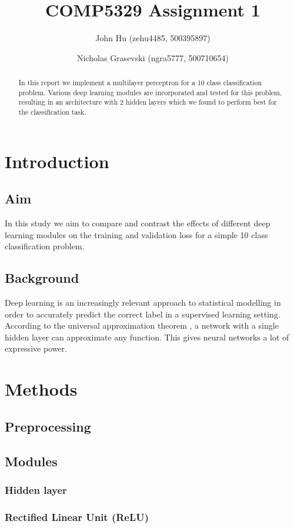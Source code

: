 \documentclass[landscape,twocolumn]{article}
\title{COMP5329 Assignment 1}
\author{John Hu (zehu4485, 500395897) \and Nicholas Grasevski (ngra5777, 500710654)}
\begin{document}
\maketitle
\begin{abstract}
In this report we implement a multilayer perceptron for a 10 class classification problem. Various deep learning modules are incorporated and tested for this problem, resulting in an architecture with 2 hidden layers which we found to perform best for the classification task.
\end{abstract}

\section{Introduction}
\subsection{Aim}
In this study we aim to compare and contrast the effects of different deep learning modules on the training and validation loss for a simple 10 class classification problem.

\subsection{Background}
Deep learning is an increasingly relevant approach to statistical modelling in order to accurately predict the correct label in a supervised learning setting. According to the universal approximation theorem \cite{universal}, a network with a single hidden layer can approximate any function. This gives neural networks a lot of expressive power.

\section{Methods}
\subsection{Preprocessing}
\subsection{Modules}
\subsubsection{Hidden layer}
\subsubsection{Rectified Linear Unit (ReLU)}
\end{document}

